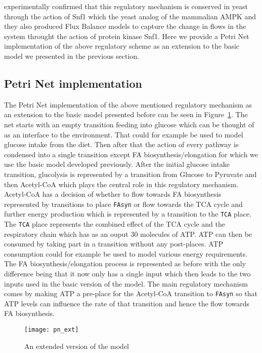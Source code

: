 \citet{nielsen2009systems} experimentally confirmed that
this regulatory mechanism is conserved in yeast through the action of
Snf1 which the yeast analog of the mammalian AMPK and they also
produced Flux Balance models to capture the
change in flows in the system throught the action of protein kinase
Snf1. Here we provide a Petri Net implementation of the above
regulatory scheme as an extension to the basic model we presented
in the previous section.

\subsection{Petri Net implementation}
The Petri Net implementation of the above mentioned regulatory
mechanism as an extension to the basic model presented before can be
seen in Figure~\ref{fig:pn_ext}. The net starts with an empty
transition feeding into glucose which can be thought of as an
interface to the environment. That could for example be used to model
glucose intake from the diet. Then after that the action of every pathway
is condensed into a single transition except FA
biosynthesis/elongation for which we use the basic model developed
previously. After the initial glucose intake transition, glucolysis is
represented by a transition from Glucose to Pyruvate and then
Acetyl-CoA which plays the central role in this regulatory
mechanism. Acetyl-CoA has a decision of whether to flow towards FA
biosynthesis represented by transitions to place \texttt{FAsyn}
or flow towards the TCA cycle and further energy production which is
represented by a transition to the \texttt{TCA}
place. The \texttt{TCA}  place represents the combined
effect of the TCA cycle and the respiratory chain which has as an
ouput 30 molecules of ATP. ATP can then be consumed by taking part in
a transition without any post-places. ATP consumption could for
example be used to model various energy requirements. The FA biosynthesis/elongation
process is represented as before with the only difference
being that it now only has a single input which then leads to the two
inputs used in the basic version of the model.
The main regulatory mechanism comes by making ATP a pre-place for the
Acetyl-CoA transition to \texttt{FAsyn} so that ATP levels can
influence the rate of that transition and hence the flow towards FA
biosynthesis.

\begin{figure}[htbp!]
\centering
\texttt{[image: pn\_ext]}
\caption[Extended Petri Net model]{An extended version of the model}
\label{fig:pn_ext}
\end{figure}


